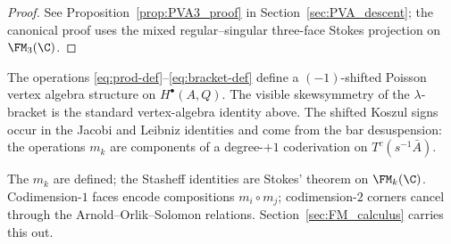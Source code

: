 \begin{proof}
See Proposition~\ref{prop:PVA3_proof} in Section~\ref{sec:PVA_descent};
the canonical proof uses the mixed regular--singular three-face Stokes
projection on $\FM_3(\C)$.
\end{proof}

\begin{corollary}
\label{cor:PVA-cohomology-bv}
\label{cor:PVA-structure-bv}
The operations \eqref{eq:prod-def}--\eqref{eq:bracket-def} define a
$(-1)$-shifted Poisson vertex algebra structure on $H^\bullet(A,Q)$.
The visible skewsymmetry of the $\lambda$-bracket is the standard
vertex-algebra identity above. The shifted Koszul signs occur in the
Jacobi and Leibniz identities and come from the bar desuspension:
the operations $m_k$ are components of a degree-$+1$ coderivation on
$T^c(s^{-1}\bar A)$.
\end{corollary}

\begin{remark}
\label{rem:transition-to-FM}
The $m_k$ are defined; the Stasheff identities are Stokes' theorem on
$\FM_k(\C)$. Codimension-$1$ faces encode compositions
$m_i \circ m_j$; codimension-$2$ corners cancel through the
Arnold--Orlik--Solomon relations.
Section~\ref{sec:FM_calculus} carries this out.
\end{remark}
